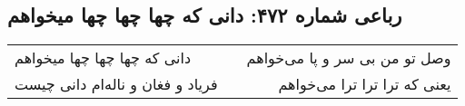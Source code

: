 \begin{center}
\section*{رباعی شماره ۴۷۲: دانی که چها چها چها میخواهم}
\label{sec:sh472}
\begin{longtable}{l p{0.5cm} r}
دانی که چها چها چها میخواهم
&&
وصل تو من بی سر و پا می‌خواهم
\\
فریاد و فغان و ناله‌ام دانی چیست
&&
یعنی که ترا ترا ترا می‌خواهم
\\
\end{longtable}
\end{center}
